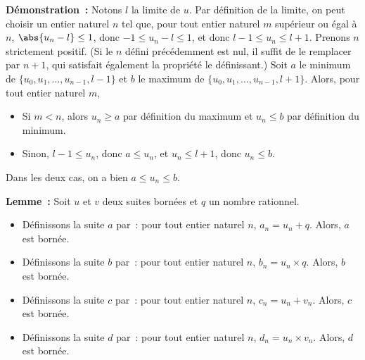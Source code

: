 \medskip

\noindent\textbf{Démonstration :} Notons $l$ la limite de $u$.
    Par définition de la limite, on peut choisir un entier naturel $n$ tel que, pour tout entier naturel $m$ supérieur ou égal à $n$, $\abs{u_n-l} \leq 1$, donc $-1 \leq u_n-l \leq 1$, et donc $l-1 \leq u_n \leq l+1$. 
    Prenons $n$ strictement positif.
    (Si le $n$ défini précédemment est nul, il suffit de le remplacer par $n+1$, qui satisfait également la propriété le définissant.)
    Soit $a$ le minimum de $\lbrace u_0, u_1, \dots, u_{n-1}, l-1 \rbrace$ et $b$ le maximum de $\lbrace u_0, u_1, \dots, u_{n-1}, l+1 \rbrace$.
    Alors, pour tout entier naturel $m$, 
    \begin{itemize}[nosep]
        \item Si $m < n$, alors $u_n \geq a$ par définition du maximum et $u_n \leq b$ par définition du minimum.
        \item Sinon, $l-1 \leq u_n$, donc $a \leq u_n$, et $u_n \leq l+1$, donc $u_n \leq b$.
    \end{itemize}
    Dans les deux cas, on a bien $a \leq u_n \leq b$.

    \done

\medskip

\noindent\textbf{Lemme :} Soit $u$ et $v$ deux suites bornées et $q$ un nombre rationnel.
    \begin{itemize}[nosep]
        \item Définissons la suite $a$ par : pour tout entier naturel $n$, $a_n = u_n + q$.
            Alors, $a$ est bornée.
        \item Définissons la suite $b$ par : pour tout entier naturel $n$, $b_n = u_n \times q$.
            Alors, $b$ est bornée.
        \item Définissons la suite $c$ par : pour tout entier naturel $n$, $c_n = u_n + v_n$.
            Alors, $c$ est bornée.
        \item Définissons la suite $d$ par : pour tout entier naturel $n$, $d_n = u_n \times v_n$.
            Alors, $d$ est bornée.
    \end{itemize}

\medskip

